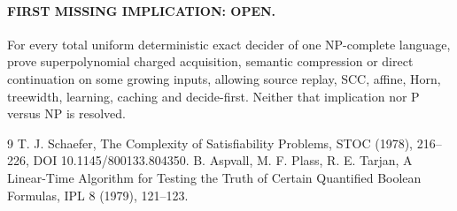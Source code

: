 \documentclass[11pt]{article}
\begin{document}
\paragraph{FIRST MISSING IMPLICATION: OPEN.} For every total uniform deterministic exact decider of one NP-complete language, prove superpolynomial charged acquisition, semantic compression or direct continuation on some growing inputs, allowing source replay, SCC, affine, Horn, treewidth, learning, caching and decide-first. Neither that implication nor P versus NP is resolved.
\begin{thebibliography}{9}
 T. J. Schaefer, The Complexity of Satisfiability Problems, STOC (1978), 216--226, DOI 10.1145/800133.804350.
 B. Aspvall, M. F. Plass, R. E. Tarjan, A Linear-Time Algorithm for Testing the Truth of Certain Quantified Boolean Formulas, IPL 8 (1979), 121--123.
\end{thebibliography}
\end{document}
